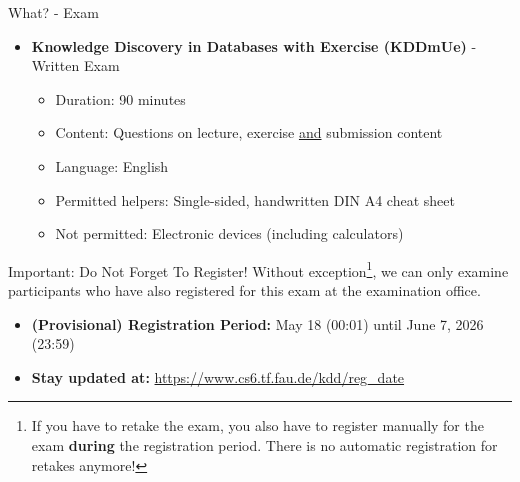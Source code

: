 \begin{frame}{What? - Exam}
	\begin{itemize}
		\item \textbf{Knowledge Discovery in Databases with Exercise (KDDmUe)} - {\color{faugray}Written Exam}
		      \begin{itemize}
			      \item Duration: 90 minutes
			      \item Content: Questions on lecture, exercise \underline{and} submission content
			      \item Language: English
			      \item Permitted helpers: Single-sided, handwritten DIN A4 cheat sheet
			      \item Not permitted: Electronic devices (including calculators)
		      \end{itemize}
	\end{itemize}

	\vspace*{0.75cm}

	\begin{alertblock}{Important: Do Not Forget To Register!}
		Without exception\footnote{If you have to retake the exam, you also have to register manually for the exam \textbf{during} the registration period. There is no automatic registration for retakes anymore!}, we can only examine participants who have also registered for this exam at the examination office.

		\begin{itemize}
			\item \textbf{(Provisional) Registration Period:} May 18 (00:01) until June 7, 2026 (23:59)
			\item \textbf{Stay updated at:} \url{https://www.cs6.tf.fau.de/kdd/reg_date}
		\end{itemize}
	\end{alertblock}
\end{frame}

